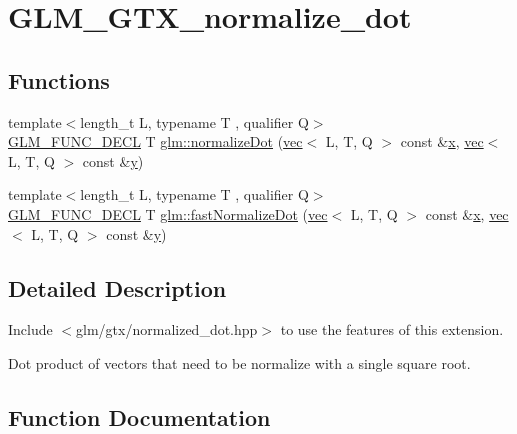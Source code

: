 \hypertarget{group__gtx__normalize__dot}{}\section{G\+L\+M\+\_\+\+G\+T\+X\+\_\+normalize\+\_\+dot}
\label{group__gtx__normalize__dot}
\subsection*{Functions}
\begin{DoxyCompactItemize}
\item 
{\footnotesize template$<$length\+\_\+t L, typename T , qualifier Q$>$ }\\\hyperlink{setup_8hpp_ab2d052de21a70539923e9bcbf6e83a51}{G\+L\+M\+\_\+\+F\+U\+N\+C\+\_\+\+D\+E\+CL} T \hyperlink{group__gtx__normalize__dot_gacb140a2b903115d318c8b0a2fb5a5daa}{glm\+::normalize\+Dot} (\hyperlink{structglm_1_1vec}{vec}$<$ L, T, Q $>$ const \&\hyperlink{_s_d_l__opengl_8h_ad0e63d0edcdbd3d79554076bf309fd47}{x}, \hyperlink{structglm_1_1vec}{vec}$<$ L, T, Q $>$ const \&\hyperlink{_s_d_l__opengl_8h_a1675d9d7bb68e1657ff028643b4037e3}{y})
\item 
{\footnotesize template$<$length\+\_\+t L, typename T , qualifier Q$>$ }\\\hyperlink{setup_8hpp_ab2d052de21a70539923e9bcbf6e83a51}{G\+L\+M\+\_\+\+F\+U\+N\+C\+\_\+\+D\+E\+CL} T \hyperlink{group__gtx__normalize__dot_ga2746fb9b5bd22b06b2f7c8babba5de9e}{glm\+::fast\+Normalize\+Dot} (\hyperlink{structglm_1_1vec}{vec}$<$ L, T, Q $>$ const \&\hyperlink{_s_d_l__opengl_8h_ad0e63d0edcdbd3d79554076bf309fd47}{x}, \hyperlink{structglm_1_1vec}{vec}$<$ L, T, Q $>$ const \&\hyperlink{_s_d_l__opengl_8h_a1675d9d7bb68e1657ff028643b4037e3}{y})
\end{DoxyCompactItemize}


\subsection{Detailed Description}
Include $<$glm/gtx/normalized\+\_\+dot.\+hpp$>$ to use the features of this extension.

Dot product of vectors that need to be normalize with a single square root. 

\subsection{Function Documentation}
\mbox{\label{group__gtx__normalize__dot_ga2746fb9b5bd22b06b2f7c8babba5de9e}} 
